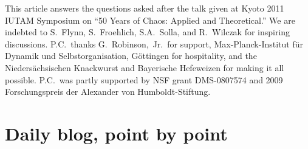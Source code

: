 \documentclass[aip,cha,reprint,
secnumarabic,
nofootinbib, tightenlines,
nobibnotes, showkeys, showpacs,
groupedaddress
]{revtex4-1}
\begin{document}
\begin{acknowledgments}
This article answers the questions asked after the talk given at
Kyoto 2011 IUTAM Symposium on ``50 Years of Chaos: Applied and Theoretical.''
We are indebted to
S.~Flynn,
S.~Froehlich,
S.A.~Solla,
and
R.~Wilczak
for inspiring discussions.
P.C.\ thanks G.~Robinson,~Jr.\ for support,
Max-Planck-Institut f\"ur Dynamik und Selbstorganisation,
G\"ottingen for hospitality,
and the Nieders\"achsischen Knackwurst and Bayerische Hefeweizen for
making it all possible.
P.C.\ was partly supported by NSF grant DMS-0807574
and
2009 Forschungspreis der Alexander von Humboldt-Stiftung.
\end{acknowledgments}





\ifdraft
    \onecolumngrid

    \newpage

    \newpage

    \newpage
    \section{Daily blog, point by point}
    \label{chap:atlas}

\fi
\end{document}
